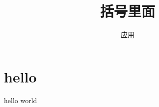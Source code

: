 \documentclass{article}
\title{括号里面}
\author{应用}
\begin{document}
\maketitle

\section{hello}
hello world
\end{document}
